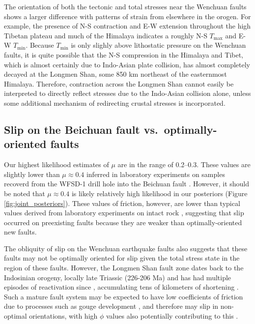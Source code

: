\documentclass[twocolumn,jgrga]{AGUTeX}
\begin{document}
\begin{article}
The orientation of both the tectonic and total stresses near the
Wenchuan faults shows a larger difference with patterns of strain from
elsewhere in the orogen. For example, the presence of N-S contraction
and E-W extension throughout the high Tibetan plateau and much of the
Himalaya \citep[e.g.,][]{armijo1986, molnar1988, taylor2003} indicates a
roughly N-S $T_{\mathrm{max}}$ and E-W $T_{\mathrm{min}}$. Because
$T_{\mathrm{min}}$ is only slighly above lithostatic pressure on the
Wenchuan faults, it is quite possible that the N-S compression in the
Himalaya and Tibet, which is almost certainly due to Indo-Asian plate
collision, has almost completely decayed at the Longmen Shan, some 850
km northeast of the easternmost Himalaya. Therefore, contraction across
the Longmen Shan cannot easily be interpreted to directly reflect
stresses due to the Indo-Asian collision alone, unless some additional
mechanism of redirecting crustal stresses is incorporated.

\subsection{Slip on the Beichuan fault vs.~optimally-oriented
faults}\label{slip-on-the-beichuan-fault-vs.optimally-oriented-faults}

Our highest likelihood estimates of $\mu$ are in the range of 0.2--0.3.
These values are slightly lower than $\mu \approx 0.4$ inferred in
laboratory experiments on samples recoverd from the WFSD-1 drill hole
into the Beichuan fault \citep{kuo2014}. However, it should be noted that
$\mu \approx 0.4$ is likely relatively high likelihood in our posteriors
(Figure \ref{fig:joint_posteriors}). These values of friction, however,
are lower than typical values derived from laboratory experiments on
intact rock \citep[e.g.,][]{byerlee1978}, suggesting that slip occurred on
preexisting faults because they are weaker than optimally-oriented new
faults.

The obliquity of slip on the Wenchuan earthquake faults also suggests
that these faults may not be optimally oriented for slip given the total
stress state in the region of these faults. However, the Longmen Shan
fault zone dates back to the Indosinian orogeny, locally late Triassic
(226-206 Ma) \citep{yong2003} and has had multiple episodes of
reactivation since \citep[e.g.,][]{burchfiel1995, wang2012}, accumulating
tens of kilometers of shortening \citep[e.g.,][]{hubbard2010}. Such a mature
fault system may be expected to have low coefficients of friction due to
processes such as gouge development \citep[e.g.,][]{kuo2014}, and therefore
may slip in non-optimal orientations, with high $\phi$ values also
potentially contributing to this \citep[e.g.,][]{sibson1985}.


\end{article}
\end{document}
